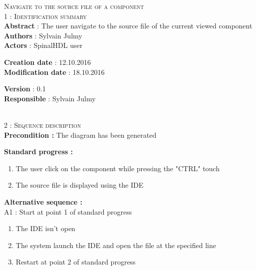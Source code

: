 \begin{flushleft}
    \textsc{\huge Navigate to the source file of a component}\\[0.5cm]

    \BlackLine
    \textsc{\Large 1 : Identification summary}\\[0.3cm]

        \textbf{\large Abstract} : The user navigate to the source file of the current viewed component \\[0.1cm]

        \textbf{\large Authors} : Sylvain Julmy \\[0.3cm]			

        \textbf{\large Actors} : SpinalHDL user \\[0.1cm]	
    \begin{minipage}{0.40\textwidth}
        \begin{flushleft}	
            \textbf{\large Creation date} : 12.10.2016 \\[0.1cm]

            \textbf{\large Modification date} : 18.10.2016 \\[0.1cm]
        \end{flushleft}
    \end{minipage}
    \begin{minipage}{0.40\textwidth}
        \begin{flushleft}
            \textbf{\large Version} : 0.1 \\[0.1cm]

            \textbf{\large Responsible} : Sylvain Julmy \\[0.1cm]
        \end{flushleft}
    \end{minipage}
    \\[0.5cm]
    \BlackLine
    \textsc{\Large 2 : Sequence description}\\[0.3cm]

    \textbf{\large Precondition :} The diagram has been generated

    \textbf{\large  Standard progress :}
    \begin{enumerate}[nosep]
        \item The user click on the component while pressing the "CTRL" touch
        \item The source file is displayed using the IDE
    \end{enumerate}

    \textbf{\large  Alternative sequence :}\\
    A1 : Start at point 1 of standard progress
    \begin{enumerate}[nosep]
        \item The IDE isn't open
        \item The system launch the IDE and open the file at the specified line
        \item Restart at point 2 of standard progress
    \end{enumerate}


\end{flushleft}
